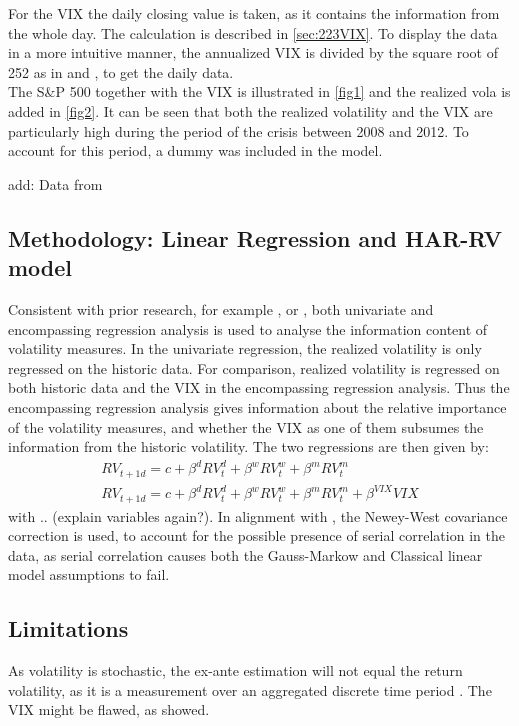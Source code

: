 For the VIX the daily closing value is taken, as it contains the information from the whole day. The calculation is described in \ref{sec:223VIX}. To display the data in a more intuitive manner, the annualized VIX is divided by the square root of 252 as in \textcite{blair2000} and \textcite{whaley2008}, to get the daily data.\\
The S\&P 500 together with the VIX is illustrated in \ref{fig1} and the realized vola is added in \ref{fig2}. It can be seen that both the realized volatility and the VIX are particularly high during the period of the crisis between 2008 and 2012. To account for this period, a dummy was included in the model.



add: Data from \citeauthor{heber2009}



\subsection{Methodology: Linear Regression and HAR-RV model}\label{sec:42Method}
Consistent with prior research, for example \textcite{jiang2003}, \textcite{canina1993} or \textcite{christensen1998}, both univariate and encompassing regression analysis is used to analyse the information content of volatility measures. In the univariate regression, the realized volatility is only regressed on the historic data. For comparison, realized volatility is regressed on both historic data and the VIX in the encompassing regression analysis. Thus the encompassing regression analysis gives information about the relative importance of the volatility measures, and whether the VIX as one of them subsumes the information from the historic volatility. The two regressions are then given by:
\begin{align}\label{eq:myregression}
RV_{t+1d} = c + \beta^{d} RV^{d}_{t} + \beta^{w} RV^{w}_{t} + \beta^{m} RV^{m}_{t}  \\
RV_{t+1d} = c + \beta^{d} RV^{d}_{t} + \beta^{w} RV^{w}_{t} + \beta^{m} RV^{m}_{t} + \beta^{VIX} VIX
\end{align}
with .. (explain variables again?). In alignment with \textcite{corsi2009}, the Newey-West covariance correction is used, to account for the possible presence of serial correlation in the data, as serial correlation causes both the Gauss-Markow and Classical linear model assumptions to fail. 


\subsection{Limitations}\label{sec:32Limits}
As volatility is stochastic, the ex-ante estimation will not equal the return volatility, as it is a measurement over an aggregated discrete time period \parencite{andersen2001}.
The VIX might be flawed, as \textcite{jiang2007} showed.

